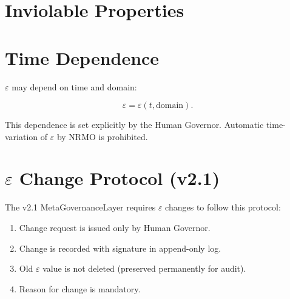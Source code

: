\section{Inviolable Properties}
\label{sec:epsilon-inviolable}


\section{Time Dependence}
\label{sec:epsilon-time-dependence}

$\varepsilon$ may depend on time and domain:

\begin{equation}
\varepsilon = \varepsilon(t, \mathrm{domain}).
\end{equation}

This dependence is set explicitly by the Human Governor. Automatic
time-variation of $\varepsilon$ by NRMO is prohibited.

\section{$\varepsilon$ Change Protocol (v2.1)}
\label{sec:epsilon-change-protocol}

The v2.1 MetaGovernanceLayer requires $\varepsilon$ changes to
follow this protocol:

\begin{enumerate}
\item Change request is issued only by Human Governor.
\item Change is recorded with signature in append-only log.
\item Old $\varepsilon$ value is not deleted (preserved permanently
for audit).
\item Reason for change is mandatory.
\end{enumerate}

